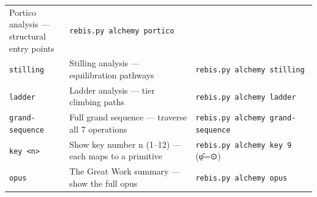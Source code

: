 \documentclass[12pt,a4paper]{article}
\begin{document}
\begin{longtable}[]{@{}lll@{}}
\begin{minipage}[t]{0.35\columnwidth}
Portico analysis --- structural entry points\strut
\end{minipage} & \begin{minipage}[t]{0.24\columnwidth}\raggedright
\texttt{rebis.py\ alchemy\ portico}\strut
\end{minipage}\tabularnewline
\begin{minipage}[t]{0.32\columnwidth}\raggedright
\texttt{stilling}\strut
\end{minipage} & \begin{minipage}[t]{0.35\columnwidth}\raggedright
Stilling analysis --- equilibration pathways\strut
\end{minipage} & \begin{minipage}[t]{0.24\columnwidth}\raggedright
\texttt{rebis.py\ alchemy\ stilling}\strut
\end{minipage}\tabularnewline
\begin{minipage}[t]{0.32\columnwidth}\raggedright
\texttt{ladder}\strut
\end{minipage} & \begin{minipage}[t]{0.35\columnwidth}\raggedright
Ladder analysis --- tier climbing paths\strut
\end{minipage} & \begin{minipage}[t]{0.24\columnwidth}\raggedright
\texttt{rebis.py\ alchemy\ ladder}\strut
\end{minipage}\tabularnewline
\begin{minipage}[t]{0.32\columnwidth}\raggedright
\texttt{grand-sequence}\strut
\end{minipage} & \begin{minipage}[t]{0.35\columnwidth}\raggedright
Full grand sequence --- traverse all 7 operations\strut
\end{minipage} & \begin{minipage}[t]{0.24\columnwidth}\raggedright
\texttt{rebis.py\ alchemy\ grand-sequence}\strut
\end{minipage}\tabularnewline
\begin{minipage}[t]{0.32\columnwidth}\raggedright
\texttt{key\ \textless{}n\textgreater{}}\strut
\end{minipage} & \begin{minipage}[t]{0.35\columnwidth}\raggedright
Show key number n (1--12) --- each maps to a primitive\strut
\end{minipage} & \begin{minipage}[t]{0.24\columnwidth}\raggedright
\texttt{rebis.py\ alchemy\ key\ 9} (φ̂=⊙)\strut
\end{minipage}\tabularnewline
\begin{minipage}[t]{0.32\columnwidth}\raggedright
\texttt{opus}\strut
\end{minipage} & \begin{minipage}[t]{0.35\columnwidth}\raggedright
The Great Work summary --- show the full opus\strut
\end{minipage} & \begin{minipage}[t]{0.24\columnwidth}\raggedright
\texttt{rebis.py\ alchemy\ opus}\strut
\end{minipage}\tabularnewline
\bottomrule
\end{longtable}
\end{document}
